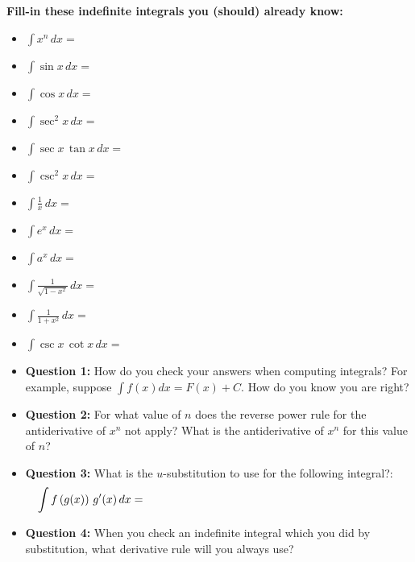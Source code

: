 \documentclass[12pt]{article}
\renewcommand{\d}{\displaystyle}
\begin{document}
\small
\begin{framed}
  \textbf{Fill-in these indefinite integrals you (should) already know:}

  \begin{multicols}{2}
    \begin{itemize}
    \item $\d \int x^n\, dx = $
    \item $\d \int \sin x\, dx =$
    \item $\d \int \cos x\, dx = $
    \item $\d \int \sec^2 x\, dx =$
    \item $\d \int \sec x\, \tan x\, dx= $
    \item $\d \int \csc^2 x\, dx =$
\columnbreak
    \item $\d \int \frac 1 x\, dx =$
    \item $\d \int e^x\, dx =$
    \item $\d \int a^x\, dx =$
    \item $\d \int \frac{1}{\sqrt{1-x^2}}\, dx =$ \phantom{sdlfjk asdlfkj alsdkjf asdlfkj asldj}
    \item $\d \int \frac{1}{1+x^2}\, dx =$
    \item $\d \int \csc x\, \cot x\, dx= $
    \end{itemize}
  \end{multicols}
\end{framed}
\small

\begin{itemize}
\item \textbf{Question 1:} How do you check your answers when computing integrals? For example, suppose $\int f(x) dx = F(x) + C$. How do you know you are right?
\vfill

\item \textbf{Question 2:} For what value of $n$ does the reverse power rule for the antiderivative of $x^n$ not apply?  What is the antiderivative of $x^n$ for this value of $n$?
\vfill

\item \textbf{Question 3:} What is the $u$-substitution to use for the following integral?:
    $$\int f\left(g(x)\right)\,g'(x)\,dx = \hspace{80mm}$$
\vfill

\item \textbf{Question 4:} When you check an indefinite integral which you did by substitution, what derivative rule will you always use?
\vfill

\end{itemize}
\end{document}
